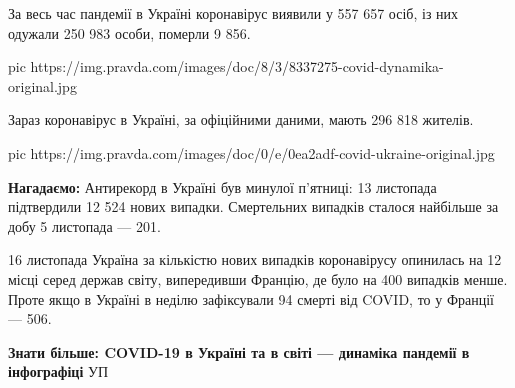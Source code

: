 За весь час пандемії в Україні коронавірус виявили у 557 657 осіб, із них
одужали 250 983 особи, померли 9 856.

\ifcmt
pic https://img.pravda.com/images/doc/8/3/8337275-covid-dynamika-original.jpg
\fi

Зараз коронавірус в Україні, за офіційними даними, мають 296 818 жителів.

\ifcmt
pic https://img.pravda.com/images/doc/0/e/0ea2adf-covid-ukraine-original.jpg
\fi

\textbf{Нагадаємо:} Антирекорд в Україні був минулої п'ятниці: 13 листопада
підтвердили 12 524 нових випадки. Смертельних випадків сталося найбільше за
добу 5 листопада --- 201.

16 листопада Україна за кількістю нових випадків коронавірусу опинилась на 12
місці серед держав
світу, випередивши
Францію, де було на 400 випадків менше.  Проте якщо в Україні в неділю
зафіксували 94 смерті від COVID, то у Франції --- 506.

\textbf{Знати більше: COVID-19 в Україні та в світі --- динаміка пандемії в інфографіці}
УП
